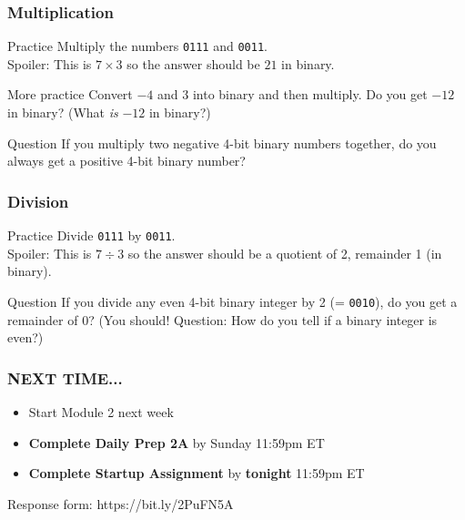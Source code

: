 \documentclass{beamer}
\begin{document}
\begin{frame}
    \frametitle{Multiplication}

    \begin{block}{Practice}
        Multiply the numbers \texttt{0111} and \texttt{0011}. \\

        Spoiler: This is $7 \times 3$ so the answer should be $21$ in binary. 
        
    \end{block}

    \begin{block}{More practice}
        Convert $-4$ and $3$ into binary and then multiply. Do you get $-12$ in binary? (What \emph{is} $-12$ in binary?)
    \end{block}

    \begin{block}{Question}
        If you multiply two negative 4-bit binary numbers together, do you always get a positive 4-bit binary number? 
    \end{block}
    

\end{frame}

\begin{frame}
    \frametitle{Division}

    \begin{block}{Practice}
        Divide \texttt{0111} by \texttt{0011}. \\

        Spoiler: This is $7 \div 3$ so the answer should be a quotient of 2, remainder 1 (in binary).
        
    \end{block}



    \begin{block}{Question}
        If you divide any even 4-bit binary integer by 2 (= \texttt{0010}), do you get a remainder of $0$? (You should! Question: How do you tell if a binary integer is even?)
    \end{block}
    

\end{frame}

\begin{frame}
    \frametitle{NEXT TIME...}

    \begin{itemize}
        \item Start Module 2 next week
        \item \textbf{Complete Daily Prep 2A} by Sunday 11:59pm ET 
        \item \textbf{Complete Startup Assignment} by \textbf{tonight} 11:59pm ET 
    \end{itemize}

Response form: https://bit.ly/2PuFN5A

\end{frame}
\end{document}
